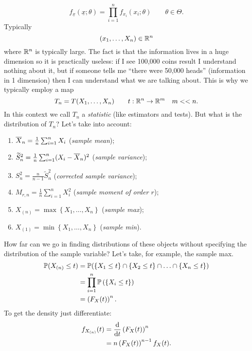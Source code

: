 \documentclass[12pt]{report}
\begin{document}
\begin{equation*}
	f_{\underline{x}}(\underline{x};\theta)=\prod_{i=1}^{n}f_{x_{i}}(x_{i};\theta)\qquad\theta\in\Theta.
\end{equation*}
Typically 
\begin{equation*}
	(x_{1},\ldots,X_{n})\in\mathbb{R}^{n}
\end{equation*}
where $\mathbb{R}^{n}$ is typically large. The fact is that the information lives in a huge dimension so it is practically useless: if I see 100,000 coins result I understand nothing about it, but if someone tells me ``there were 50,000 heads'' (information in 1 dimension) then I can understand what we are talking about. This is why we typically employ a map
\begin{equation*}
	T_{n}=T(X_{1},\ldots,X_{n})\qquad t:\mathbb{R}^{n}\to\mathbb{R}^{m}\quad m<<n.
\end{equation*}
In this context we call $T_{n}$ a \emph{statistic} (like estimators and tests). But what is the distribution of $T_{n}$? Let's take into account:
\begin{enumerate}[\circnum]
	\item $\overline{X}_{n}=\frac{1}{n}\sum_{i=1}^{n}X_{i}$ (\emph{sample mean});
	\item $\widetilde{S}^{2}_{n}=\frac{1}{n}\sum_{i=1}^{n}(X_{i}-\overline{X}_{n})^{2}$ (\emph{sample variance});
	\item $S^{2}_{n}=\frac{n}{n-1}\widetilde{S}^{2}_{n}$ (\emph{corrected sample variance});
	\item $M_{r,n}=\frac{1}{n}\sum_{i=1}^{n}X_{i}^{2}$ (\emph{sample moment of order $r$});
	\item $X_{(n)}=\max\left\{X_{1},\ldots,X_{n}\right\}$ (\emph{sample max});
	\item $X_{(1)}=\min\left\{X_{1},\ldots,X_{n}\right\}$ (\emph{sample min}).
\end{enumerate}
How far can we go in finding distributions of these objects without specifying the distribution of the sample variable?
Let's take, for example, the sample max.
\begin{align*}
	\mathbb{P}(X_{(n)}\leq t)&=\mathbb{P}(\left\{X_{1}\leq t\right\}\cap\left\{X_{2}\leq t\right\}\cap\ldots\cap\left\{X_{n}\leq t\right\})\\
	&=\prod_{i=1}^{n}\mathbb{P}\left(\left\{X_{i}\leq t\right\}\right)\\
	&=\left(F_{X}(t)\right)^{n}.
\end{align*}
To get the density just differentiate:
\begin{align*}
	f_{X_{(n)}}(t)&=\frac{\mathop{}\!\mathrm{d}}{\mathop{}\!\mathrm{d} t}\left(F_{X}(t)\right)^{n}\\&=n\left(F_{X}(t)\right)^{n-1}f_{X}(t).
\end{align*}
\end{document}
